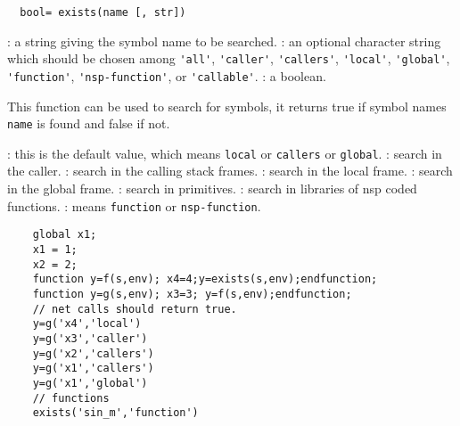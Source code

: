 \begin{mandesc}
\end{mandesc}
\begin{calling_sequence}
\begin{verbatim}
  bool= exists(name [, str])  
\end{verbatim}
\end{calling_sequence}
\begin{parameters}
  \begin{varlist}
    : a string giving the symbol name to be searched.
    : an optional character string which should be chosen 
    among \verb+'all'+, \verb+'caller'+, \verb+'callers'+, \verb+'local'+,
    \verb+'global'+, \verb+'function'+, \verb+'nsp-function'+, or 
    \verb+'callable'+.
    : a boolean. 
  \end{varlist}
\end{parameters}
\begin{mandescription}
  This function can be used to search for symbols, it returns true if 
  symbol names \verb+name+ is found and false if not. 
  \begin{varlist}
    : this is the default value, which  means \verb+local+ or 
    \verb+callers+ or \verb+global+.
    :  search in the caller. 
    : search in the calling stack frames.
    : search in the local frame.
    : search in the global frame.
    : search in primitives. 
    : search in libraries of nsp coded functions.
    : means \verb+function+ or \verb+nsp-function+.
  \end{varlist}
\end{mandescription}
\begin{examples}
  \begin{Verbatim}
    global x1;
    x1 = 1;
    x2 = 2;
    function y=f(s,env); x4=4;y=exists(s,env);endfunction;
    function y=g(s,env); x3=3; y=f(s,env);endfunction;
    // net calls should return true.
    y=g('x4','local')
    y=g('x3','caller')
    y=g('x2','callers')
    y=g('x1','callers')
    y=g('x1','global')
    // functions 
    exists('sin_m','function')
  \end{Verbatim}
\end{examples}
\begin{manseealso}
\end{manseealso}
